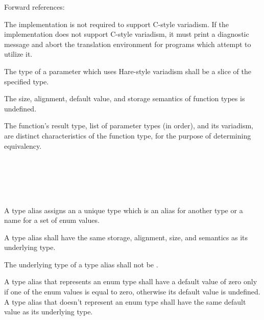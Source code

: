 Forward references: 

\specsubsubitem
The implementation is not required to support C-style variadism. If the
implementation does not support C-style variadism, it must print a diagnostic
message and abort the translation environment for programs which attempt to
utilize it.

\specsubsubitem
The type of a parameter which uses Hare-style variadism shall be a slice of the
specified type.


\specsubsubitem
The size, alignment, default value, and storage semantics of function types is
undefined.

\specsubsubitem
The function's result type, list of parameter types (in order), and its
variadism, are distinct characteristics of the function type, for the purpose of
determining equivalency.


\begin{grammar}
 \\
	 \\

 \\
	  \\
\end{grammar}

\specsubsubitem
A type alias assigns an  a unique type which is an
alias for another type or a name for a set of enum values.


\specsubsubitem
A type alias shall have the same storage, alignment, size, and semantics as its
underlying type.

\specsubsubitem
The underlying type of a type alias shall not be .

\specsubsubitem
A type alias that represents an enum type shall have a default value of zero
only if one of the enum values is equal to zero, otherwise its default value is
undefined. A type alias that doesn't represent an enum type shall have the same
default value as its underlying type.

